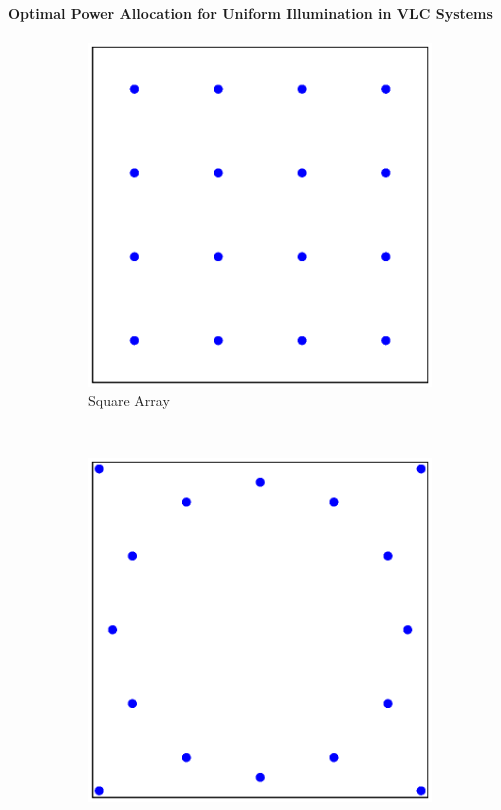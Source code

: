 \documentclass[slidestop,usepdftitle=false]{gvvslides}
\begin{document}
\begin{frame}
\frametitle{\,}
\framesubtitle{Optimal Power Allocation for Uniform Illumination in VLC Systems}

\begin{figure}
\centering
\begin{subfigure}{0.33\columnwidth}
\includegraphics[width=\columnwidth]{c4_deploy_sq}
\caption{Square Array }
\end{subfigure}~
\begin{subfigure}{0.33\columnwidth}
\includegraphics[width=\columnwidth]{c4_deploy_cirsq}

\end{subfigure}
\end{figure}
\end{frame}
\end{document}
